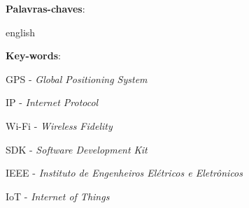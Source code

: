 
\setlength{\absparsep}{18pt} %
\begin{resumo}


    \textbf{Palavras-chaves}:

\end{resumo}

\begin{resumo}[Abstract]
    \begin{otherlanguage*}{english}

        \vspace{\onelineskip}

        \noindent
        \textbf{Key-words}:
    \end{otherlanguage*}
\end{resumo}


\listoffigures*


\begin{siglas}

    \item GPS - \textit{Global Positioning System}
    \item IP - \textit{Internet Protocol}
    \item Wi-Fi - \textit{Wireless Fidelity}
    \item SDK - \textit{Software Development Kit}
    \item IEEE - \textit{Instituto de Engenheiros Elétricos e Eletrônicos}
    \item IoT - \textit{Internet of Things}

\end{siglas}


\tableofcontents*
\cleardoublepage


